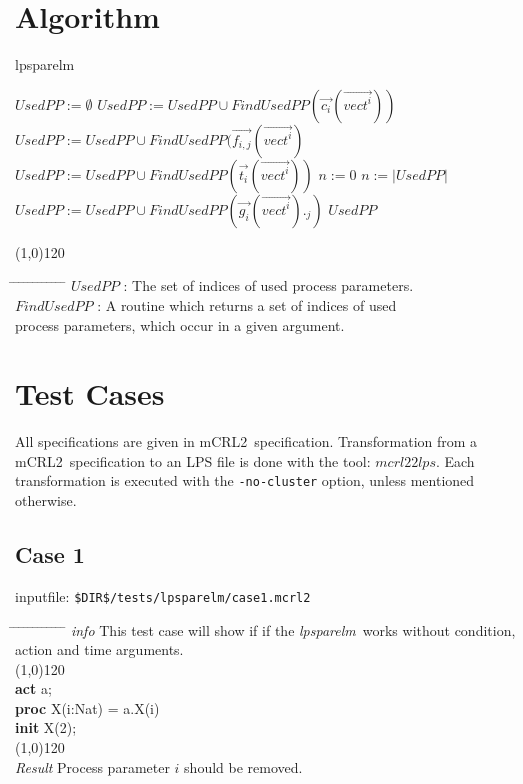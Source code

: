 \documentclass[a4paper,10pt]{article}
\theoremstyle{plain}
\theoremstyle{definition}
\newcommand{\mcrl}{mCRL2}
\newcommand{\tool}{\textit{lpsparelm}}
\newcommand{\ti}{\textit}
\newcommand{\tb}{\textbf}
\newcommand{\ovr}{\overrightarrow}
\newcommand{\pps}{process parameters}
\newcommand{\tab}{\hspace*{5.mm} \= \hspace*{5.mm} \= \hspace*{5.mm} \= \hspace*{5.mm} \= \hspace*{5.mm} \= \hspace*{5.mm}  \= \hspace*{5.mm}  \= \hspace*{5.mm}  \= \hspace*{5.mm} \= \hspace*{5.mm} \= \hspace*{5.mm}  \= \hspace*{5.mm}  \= \hspace*{5.mm}\kill}
\newcommand{\tabw}{\hspace*{15.mm} \= \hspace*{20.mm} \= \hspace*{5.mm} \= \hspace*{5.mm} \= \hspace*{5.mm} \= \hspace*{5.mm}  \= \hspace*{5.mm}  \= \hspace*{5.mm}  \= \hspace*{5.mm} \= \hspace*{5.mm} \= \hspace*{5.mm}  \= \hspace*{5.mm}  \= \hspace*{5.mm}\kill}
\begin{document}
\newpage
\section{Algorithm} \label{sec:alg}
\begin{algorithm}[h]
\caption{lpsparelm}
\begin{algorithmic}[1]
\STATE $UsedPP := \emptyset $
    \STATE $UsedPP := UsedPP \cup FindUsedPP(\ovr{c_i}(\ovr{vect^i}))$
      \STATE $UsedPP := UsedPP \cup FindUsedPP(\ovr{f_{i,j}}(\ovr{vect^i})$
    \ENDFOR
    \STATE $UsedPP := UsedPP \cup FindUsedPP(\ovr{t_i}(\ovr{vect^i}))$
  \ENDFOR
\STATE $n := 0$
\STATE $n := \vert UsedPP \vert$
      \STATE $UsedPP := UsedPP \cup FindUsedPP(\ovr{g_i}(\ovr{vect^i})._j) $
    \ENDFOR
  \ENDFOR
\ENDWHILE
\RETURN $UsedPP$
\end{algorithmic}
\line(1,0){120}
\begin{tabbing}
\tab
$UsedPP$ \> \> \> \> : \> The set of indices of used \pps .\\
$FindUsedPP$ \> \> \> \> : \> A routine which returns a set of indices of used\\
\> \> \> \> \> \pps, which occur in a given argument.
\end{tabbing}
\end{algorithm}

\newpage
\section{Test Cases}
All specifications are given in \mcrl\ specification.
Transformation from a \mcrl\ specification to an LPS file is done with the tool:
$mcrl22lps$. Each transformation is executed with the \verb"-no-cluster" option, unless
mentioned otherwise.

\subsection*{Case 1}
inputfile: \verb"$DIR$/tests/lpsparelm/case1.mcrl2"
\begin{tabbing}
\tabw
\ti{info} \> This test case will show if if the \tool\ works without condition, action and time arguments.\\
\line(1,0){120}\\
\tb{act} \> a; \\
\tb{proc} \> X(i:Nat) = \> a.X(i)\\
\tb{init} \> X(2); \\  
\line(1,0){120}\\
\ti{Result} \> Process parameter $i$ should be removed.\\ 
\end{tabbing}
\end{document}
